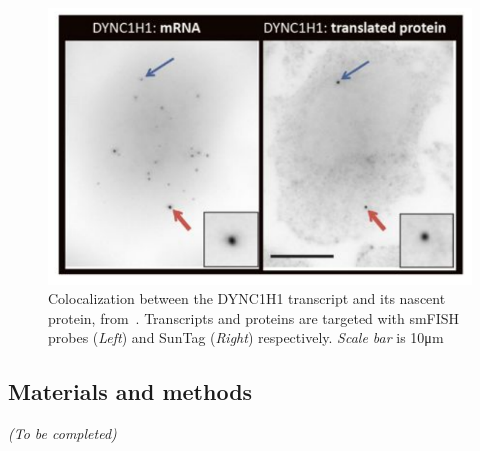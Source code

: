 \begin{figure}[h]
    \centering
    \includegraphics[width=\textwidth]{figures/chapter5/translation_factory}
    \caption{Colocalization between the DYNC1H1 transcript and its nascent protein, from~\cite{pichon_visualization_2016}.
	Transcripts and proteins are targeted with smFISH probes (\textit{Left}) and SunTag (\textit{Right}) respectively.
	\textit{Scale bar} is 10μm}
    \label{fig:translation_factory}
\end{figure}

\subsection{Materials and methods}
\label{subsec:materials_translation_factories}

\begin{center}
	\textit{(To be completed)}
\end{center}



